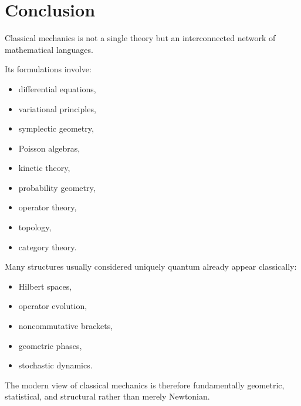 \documentclass[11pt]{book}
\begin{document}
\chapter{Conclusion}

Classical mechanics is not a single theory but an interconnected network of mathematical languages.

Its formulations involve:

\begin{itemize}
\item differential equations,
\item variational principles,
\item symplectic geometry,
\item Poisson algebras,
\item kinetic theory,
\item probability geometry,
\item operator theory,
\item topology,
\item category theory.
\end{itemize}

Many structures usually considered uniquely quantum already appear classically:

\begin{itemize}
\item Hilbert spaces,
\item operator evolution,
\item noncommutative brackets,
\item geometric phases,
\item stochastic dynamics.
\end{itemize}

The modern view of classical mechanics is therefore fundamentally geometric, statistical, and structural rather than merely Newtonian.


\end{document}
